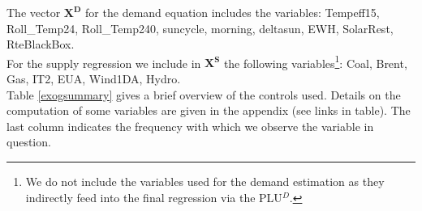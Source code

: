 The vector $\boldsymbol{X^D}$ for the demand equation includes the variables: Tempeff15, Roll\_Temp24, Roll\_Temp240, suncycle, morning, deltasun, EWH, SolarRest, RteBlackBox.\\

For the supply regression we include in $\boldsymbol{X^S}$ the following variables\footnote{We do not include the variables used for the demand estimation as they indirectly feed into the final regression via the PLU$^D$.}: 
Coal, Brent, Gas, IT2, EUA, Wind1DA, Hydro. \\
 
Table \ref{exogsummary} gives a brief overview of the controls used. Details on the computation of some  variables are given in the appendix (see links in table). The last column indicates the frequency with which we observe the variable in question. 


